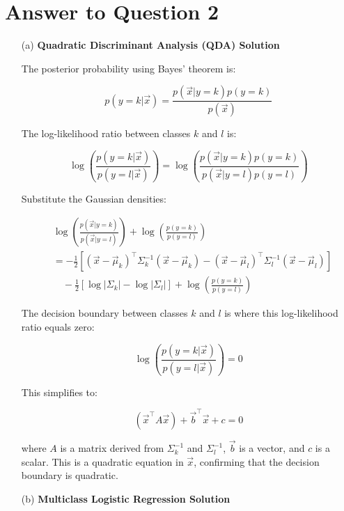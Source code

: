 \documentclass{article}
\begin{document}
\section*{Answer to Question 2}

\begin{enumerate}
    \item[(a)] \textbf{Quadratic Discriminant Analysis (QDA) Solution}
    
    The posterior probability using Bayes' theorem is:
    
    \[
    p(y = k | \vec{x}) = \frac{p(\vec{x} | y = k) p(y = k)}{p(\vec{x})}
    \]
    
    The log-likelihood ratio between classes \( k \) and \( l \) is:
    
    \[
    \log \left( \frac{p(y = k | \vec{x})}{p(y = l | \vec{x})} \right) = \log \left( \frac{p(\vec{x} | y = k) p(y = k)}{p(\vec{x} | y = l) p(y = l)} \right)
    \]
    
    Substitute the Gaussian densities:
    
    \begin{align*}
    & \log \left( \frac{p(\vec{x} | y = k)}{p(\vec{x} | y = l)} \right) + \log \left( \frac{p(y = k)}{p(y = l)} \right) \\
    &= -\frac{1}{2} \left[ (\vec{x} - \vec{\mu}_k)^\top \Sigma_k^{-1} (\vec{x} - \vec{\mu}_k) - (\vec{x} - \vec{\mu}_l)^\top \Sigma_l^{-1} (\vec{x} - \vec{\mu}_l) \right] \\
    &\quad - \frac{1}{2} \left[ \log |\Sigma_k| - \log |\Sigma_l| \right ] + \log \left( \frac{p(y = k)}{p(y = l)} \right)
    \end{align*}
    
    The decision boundary between classes \( k \) and \( l \) is where this log-likelihood ratio equals zero:
    
    \[
    \log \left( \frac{p(y = k | \vec{x})}{p(y = l | \vec{x})} \right) = 0
    \]
    
    This simplifies to:
    
    \[
    (\vec{x}^\top A \vec{x}) + \vec{b}^\top \vec{x} + c = 0
    \]
    
    where \( A \) is a matrix derived from \( \Sigma_k^{-1} \) and \( \Sigma_l^{-1} \), \( \vec{b} \) is a vector, and \( c \) is a scalar. This is a quadratic equation in \( \vec{x} \), confirming that the decision boundary is quadratic.
    
    \item[(b)] \textbf{Multiclass Logistic Regression Solution}
    

\end{enumerate}
\end{document}
